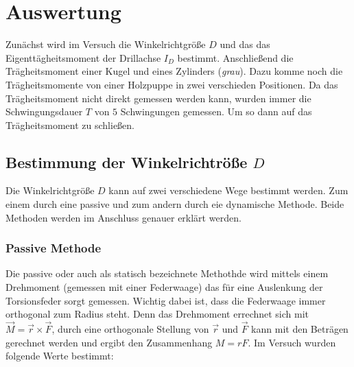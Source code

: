 \section{Auswertung}

Zunächst wird im Versuch die Winkelrichtgröße $D$ und das
das Eigenttägheitsmoment der Drillachse $I_D$ bestimmt.
Anschließend die Trägheitsmoment einer Kugel und eines Zylinders (\emph{grau}).
Dazu komme noch die Trägheitsmomente von einer Holzpuppe in zwei verschieden Positionen.
Da das Trägheitsmoment nicht direkt gemessen werden kann, wurden immer 
die Schwingungsdauer $T$ von $5$ Schwingungen gemessen.
Um so dann auf das Trägheitsmoment zu schließen.

\subsection{Bestimmung der Winkelrichtröße $D$}

Die Winkelrichtgröße $D$ kann auf zwei verschiedene Wege bestimmt werden.
Zum einem durch eine passive und zum andern durch eie  dynamische Methode.
Beide Methoden werden im Anschluss genauer erklärt werden.

\subsubsection{Passive Methode}

Die passive oder auch als statisch bezeichnete Methothde wird mittels einem Drehmoment (gemessen mit einer Federwaage) 
das für eine Auslenkung der Torsionsfeder sorgt gemessen.
Wichtig dabei ist, dass die Federwaage immer orthogonal zum Radius steht.
Denn das Drehmoment errechnet sich mit $\vec{M}=\vec{r}\times\vec{F}$, durch 
eine orthogonale Stellung von $\vec{r}$ und $\vec{F}$ kann mit den Beträgen 
gerechnet werden und ergibt den Zusammenhang $M=rF$. 
Im Versuch wurden folgende Werte bestimmt:



